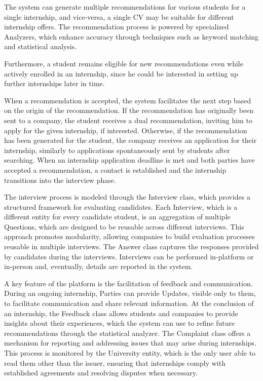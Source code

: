 The system can generate multiple recommendations for various students for a single internship, and vice-versa, a single CV may be suitable for different internship offers. The recommendation process is powered by specialized Analyzers, which enhance accuracy through techniques such as keyword matching and statistical analysis.

Furthermore, a student remains eligible for new recommendations even while actively enrolled in an internship, since he could be interested in setting up further internships later in time.

When a recommendation is accepted, the system facilitates the next step based on the origin of the recommendation. If the recommendation has originally been sent to a company, the student receives a dual recommendation, inviting him to apply for the given internship, if interested.
 Otherwise, if the recommendation has been generated for the student, the company receives an application for their internship, similarly to applications spontaneously sent by students after searching.
 When an internship application deadline is met and both parties have accepted a recommendation, a contact is established and the internship transitions into the interview phase.

The interview process is modeled through the Interview class, which provides a structured framework for evaluating candidates. Each Interview, which is a different entity for every candidate student, is an aggregation of multiple Questions, which are designed to be reusable across different interviews. This approach promotes modularity, allowing companies to build evaluation processes reusable in multiple interviews. The Answer class captures the responses provided by candidates during the interviews. Interviews can be performed in-platform or in-person and, eventually, details are reported in the system.

A key feature of the platform is the facilitation of feedback and communication. 
During an ongoing internship, Parties can provide Updates, visible only to them, to facilitate communication and share relevant information.
At the conclusion of an internship, the Feedback class allows students and companies to provide insights about their experiences, which the system can use to refine future recommendations through the statistical analyzer. 
The Complaint class offers a mechanism for reporting and addressing issues that may arise during internships. This process is monitored by the University entity, which is the only user able to read them other than the issuer, ensuring that internships comply with established agreements and resolving disputes when necessary.

